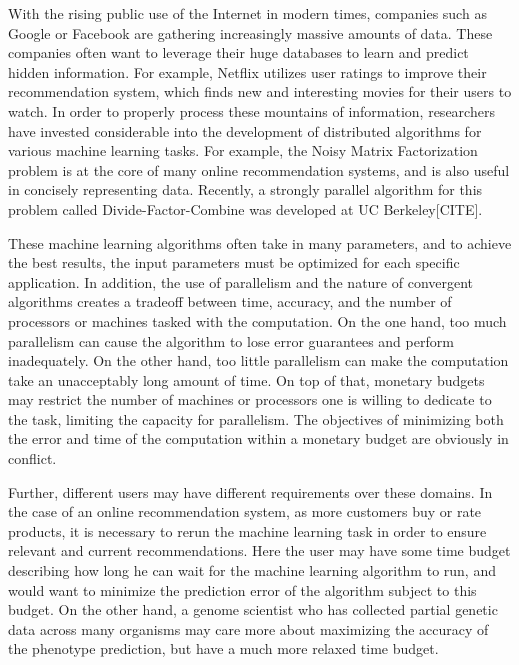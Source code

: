 With the rising public use of the Internet in modern times, companies 
such as Google or Facebook are gathering increasingly massive amounts 
of data. These companies often want to leverage their huge databases to 
learn and predict hidden information. For example, Netflix utilizes user 
ratings to improve their recommendation system, which finds new and 
interesting movies for their users to watch. In order to properly 
process these mountains of information, researchers have invested
considerable into the development of distributed algorithms for 
various machine learning tasks. For example, the Noisy Matrix Factorization 
problem is at the core of many online recommendation systems, and is
also useful in concisely representing data. Recently, a strongly parallel 
algorithm for this problem called Divide-Factor-Combine was developed 
at UC Berkeley[CITE]. 

These machine learning algorithms often take in many parameters, and
to achieve the best results, the input parameters must be optimized for
each specific application. In addition, the use of parallelism and the
nature of convergent algorithms creates a tradeoff between time, accuracy,
and the number of processors or machines tasked with the computation. 
On the one hand, too much parallelism can cause the algorithm to lose 
error guarantees and perform inadequately. On the other hand, too 
little parallelism can make the computation take an unacceptably long 
amount of time. On top of that, monetary budgets may restrict the number
of machines or processors one is willing to dedicate to the task, limiting
the capacity for parallelism. The objectives of minimizing both the error 
and time of the computation within a monetary budget are obviously 
in conflict.

Further, different users may have different requirements over these 
domains. In the case of an online recommendation system, as more 
customers buy or rate products, it is necessary to rerun the machine 
learning task in order to ensure relevant and current recommendations. 
Here the user may have some time budget describing how long he can wait 
for the machine learning algorithm to run, and would want to minimize 
the prediction error of the algorithm subject to this budget. On the other
hand, a genome scientist who has collected partial genetic data 
across many organisms may care more about maximizing the accuracy of the
phenotype prediction, but have a much more relaxed time budget. 

